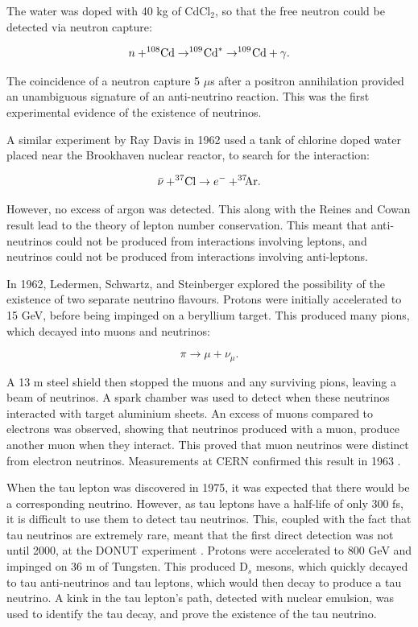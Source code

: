 The water was doped with 40 kg of CdCl$_{2}$, so that the free neutron could be detected via neutron capture:

\begin{equation}
n + ^{108}\negmedspace \text{Cd} \rightarrow ^{109}\negmedspace \text{Cd}^{*} \rightarrow ^{109}\negmedspace \text{Cd} + \gamma.
\end{equation}

The coincidence of a neutron capture 5 $\mu$s after a positron annihilation provided an unambiguous signature of an anti-neutrino reaction. This was the first experimental evidence of the existence of neutrinos.

A similar experiment by Ray Davis \cite{davis} in 1962 used a tank of chlorine doped water placed near the Brookhaven nuclear reactor, to search for the interaction:

\begin{equation}
\bar{\nu} + ^{37}\negmedspace \text{Cl} \rightarrow e^- + ^{37}\negmedspace \negmedspace \text{Ar}.
\label{eqn:argonreact}
\end{equation}

However, no excess of argon was detected. This along with the Reines and Cowan result lead to the theory of lepton number conservation. This meant that anti-neutrinos could not be produced from interactions involving leptons, and neutrinos could not be produced from interactions involving anti-leptons.

In 1962, Ledermen, Schwartz, and Steinberger \cite{lederman} explored the possibility of the existence of two separate neutrino flavours. Protons were initially accelerated to 15 GeV, before being impinged on a beryllium target. This produced many pions, which decayed into muons and neutrinos:

\begin{equation}
\pi \rightarrow \mu + \nu_{\mu}.
\end{equation}

A 13 m steel shield then stopped the muons and any surviving pions, leaving a beam of neutrinos. A spark chamber was used to detect when these neutrinos interacted with target aluminium sheets. An excess of muons compared to electrons was observed, showing that neutrinos produced with a muon, produce another muon when they interact. This proved that muon neutrinos were distinct from electron neutrinos. Measurements at CERN confirmed this result in 1963 \cite{cernnuflavs}.

When the tau lepton was discovered in 1975, it was expected that there would be a corresponding neutrino. However, as tau leptons have a half-life of only 300 fs, it is difficult to use them to detect tau neutrinos. This, coupled with the fact that tau neutrinos are extremely rare, meant that the first direct detection was not until 2000, at the DONUT experiment \cite{taudiscovery}. Protons were accelerated to 800 GeV and impinged on 36 m of Tungsten. This produced D$_{s}$ mesons, which quickly decayed to tau anti-neutrinos and tau leptons, which would then decay to produce a tau neutrino. A kink in the tau lepton's path, detected with nuclear emulsion, was used to identify the tau decay, and prove the existence of the tau neutrino.

